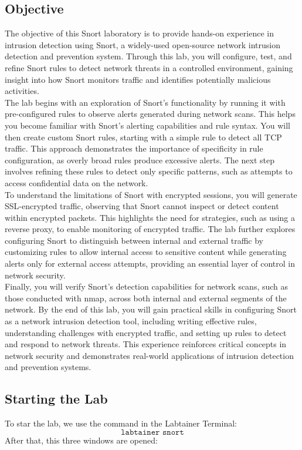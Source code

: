 \documentclass[a4paper,11pt]{article} %
\begin{document}
\subsection{Objective}
The objective of this Snort laboratory is to provide hands-on experience in intrusion detection using Snort, a widely-used open-source network intrusion detection and prevention system. Through this lab, you will configure, test, and refine Snort rules to detect network threats in a controlled environment, gaining insight into how Snort monitors traffic and identifies potentially malicious activities.\\
The lab begins with an exploration of Snort’s functionality by running it with pre-configured rules to observe alerts generated during network scans. This helps you become familiar with Snort’s alerting capabilities and rule syntax. You will then create custom Snort rules, starting with a simple rule to detect all TCP traffic. This approach demonstrates the importance of specificity in rule configuration, as overly broad rules produce excessive alerts. The next step involves refining these rules to detect only specific patterns, such as attempts to access confidential data on the network.\\
To understand the limitations of Snort with encrypted sessions, you will generate SSL-encrypted traffic, observing that Snort cannot inspect or detect content within encrypted packets. This highlights the need for strategies, such as using a reverse proxy, to enable monitoring of encrypted traffic. The lab further explores configuring Snort to distinguish between internal and external traffic by customizing rules to allow internal access to sensitive content while generating alerts only for external access attempts, providing an essential layer of control in network security.\\
Finally, you will verify Snort’s detection capabilities for network scans, such as those conducted with nmap, across both internal and external segments of the network. By the end of this lab, you will gain practical skills in configuring Snort as a network intrusion detection tool, including writing effective rules, understanding challenges with encrypted traffic, and setting up rules to detect and respond to network threats. This experience reinforces critical concepts in network security and demonstrates real-world applications of intrusion detection and prevention systems.

\subsection{Starting the Lab}
To star the lab, we use the command in the Labtainer Terminal:
\[\texttt{labtainer snort}\]
After that, this three windows are opened:
\end{document}
